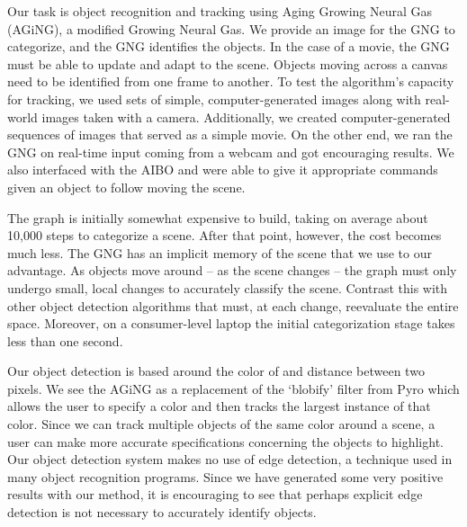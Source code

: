 \documentclass{article}
\renewcommand{\|}{\origbar} %
\begin{document}
Our task is object recognition and tracking using Aging Growing Neural Gas (AGiNG), a modified Growing Neural Gas. We provide an image for the GNG to categorize, and the GNG identifies the objects. In the case of a movie, the GNG must be able to update and adapt to the scene. Objects moving across a canvas need to be identified from one frame to another. To test the algorithm's capacity for tracking, we used sets of simple, computer-generated images along with real-world images taken with a camera. Additionally, we created computer-generated sequences of images that served as a simple movie. On the other end, we ran the GNG on real-time input coming from a webcam and got encouraging results. We also interfaced with the AIBO and were able to give it appropriate commands given an object to follow moving the scene.

The graph is initially somewhat expensive to build, taking on average about 10,000 steps to categorize a scene. After that point, however, the cost becomes much less. The GNG has an implicit memory of the scene that we use to our advantage. As objects move around -- as the scene changes -- the graph must only undergo small, local changes to accurately classify the scene. Contrast this with other object detection algorithms that must, at each change, reevaluate the entire space. Moreover, on a consumer-level laptop the initial categorization stage takes less than one second. 

Our object detection is based around the color of and distance between two pixels. We see the AGiNG as a replacement of the `blobify' filter from Pyro which allows the user to specify a color and then tracks the largest instance of that color. Since we can track multiple objects of the same color around a scene, a user can make more accurate specifications concerning the objects to highlight. Our object detection system makes no use of edge detection, a technique used in many object recognition programs. Since we have generated some very positive results with our method, it is encouraging to see that perhaps explicit edge detection is not necessary to accurately identify objects.
\end{document}
